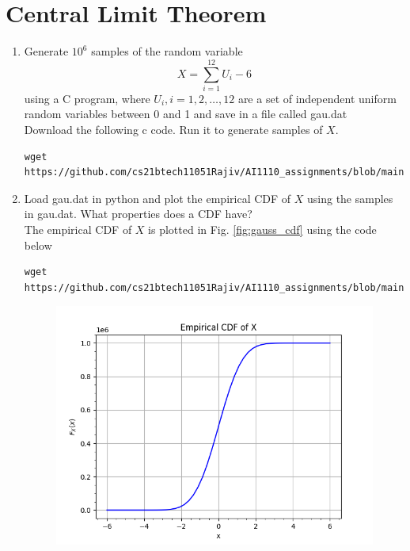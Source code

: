 \documentclass[journal,12pt,twocolumn]{IEEEtran}
\renewcommand\thesection{\arabic{section}}
\begin{document}
\section{Central Limit Theorem}
%
\begin{enumerate}[label=\thesection.\arabic*
,ref=\thesection.\theenumi]
%
\item
Generate $10^6$ samples of the random variable
%
\begin{equation}
X = \sum_{i=1}^{12}U_i -6
\end{equation}
%
using a C program, where $U_i, i = 1,2,\dots, 12$ are  a set of independent uniform random variables between 0 and 1
and save in a file called gau.dat
\\
\solution Download the following c code. Run it to generate samples of $X$.
\begin{lstlisting}
wget https://github.com/cs21btech11051Rajiv/AI1110_assignments/blob/main/manual1/code/q1/2p1.c
\end{lstlisting}
%
\item
Load gau.dat in python and plot the empirical CDF of $X$ using the samples in gau.dat. What properties does a CDF have?
\\
\solution The empirical CDF of $X$ is plotted in Fig. \ref{fig:gauss_cdf} using the code below
\begin{lstlisting}
wget https://github.com/cs21btech11051Rajiv/AI1110_assignments/blob/main/manual1/code/q1/2p2.py
\end{lstlisting}
\begin{figure}[ht!]
\centering
\includegraphics[width=\columnwidth]{./figs/fig2.2.png}

\end{figure}
\end{enumerate}
\end{document}

